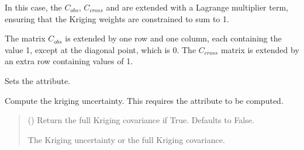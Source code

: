 \documentclass[letterpaper,10pt,english]{sphinxmanual}
\begin{document}
\begin{fulllineitems}
\begin{fulllineitems}
\sphinxAtStartPar
In this case, the \(C_{obs}\), \(C_{cross}\) and are extended
with a Lagrange multiplier term, ensuring that the Kriging weights are
constrained to sum to 1.

\sphinxAtStartPar
The matrix \(C_{obs}\) is extended by one row and one column, each
containing the value 1, except at the diagonal point, which is 0. The
\(C_{cross}\) matrix is extended by an extra row containing values
of 1.

\sphinxAtStartPar
Sets the  attribute.
\begin{quote}\begin{description}
\sphinxAtStartPar
{}

\end{description}\end{quote}

\end{fulllineitems}


\begin{fulllineitems}
\label{\detokenize{kriging:glomar_gridding.kriging.OrdinaryKriging.get_uncertainty}}
\pysigstartsignatures
\pysiglinewithargsret
{}
{}
{}
\pysigstopsignatures
\sphinxAtStartPar
Compute the kriging uncertainty. This requires the attribute
 to be computed.
\begin{quote}\begin{description}
\sphinxAtStartPar
{} () \textendash{} Return the full Kriging covariance if True. Defaults to False.

\sphinxAtStartPar
{} \textendash{} The Kriging uncertainty or the full Kriging covariance.

\sphinxAtStartPar
{}

\end{description}\end{quote}


\end{fulllineitems}
\end{fulllineitems}
\end{document}
